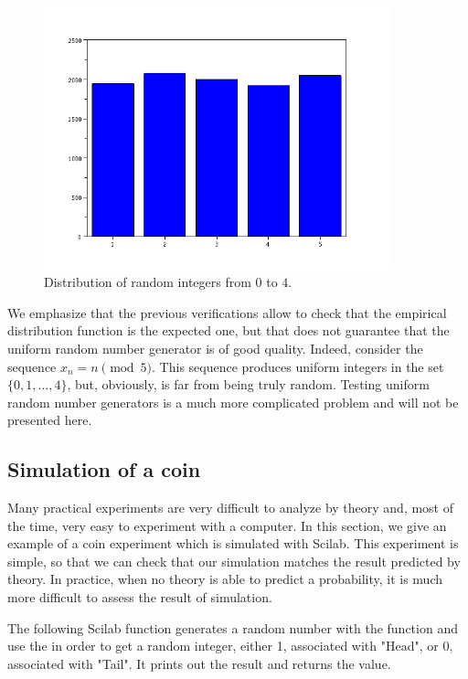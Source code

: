 \begin{figure}
\begin{center}
\includegraphics[width=10cm]{introdiscreteprobas/random_0_4.png}
\end{center}
\caption{Distribution of random integers from $0$ to $4$.}
\label{fig-introstats-distributionrandints}
\end{figure}

We emphasize that the previous verifications allow to check that the 
empirical distribution function is the expected one, but that 
does not guarantee that the uniform random number generator 
is of good quality. Indeed, consider the sequence $x_n = n \pmod{5}$. 
This sequence produces uniform integers in the set $\{0,1,\ldots,4\}$, 
but, obviously, is far from being truly random. Testing uniform random 
number generators is a much more complicated problem and will not be 
presented here. 


\subsection{Simulation of a coin}
\label{introstats-simulatecoin}

Many practical experiments are very difficult to analyze 
by theory and, most of the time, very easy to experiment 
with a computer. In this section, we give an example of a 
coin experiment which is simulated with Scilab. This 
experiment is simple, so that we can check that
our simulation matches the result predicted by theory. 
In practice, when no theory is able to predict a probability,
it is much more difficult to assess the result of simulation.

The following Scilab function generates a random number
with the  function and use the 
in order to get a random integer, either 1, associated with "Head",
or 0, associated with "Tail". It prints out the result and returns the 
value.

